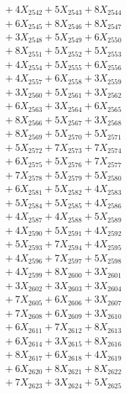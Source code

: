 \documentclass[a4paper,10pt]{article}
\begin{document}
{\begin{align}
&\;  + 4 X_{2542} + 5 X_{2543} + 8 X_{2544} \\[0.3ex]
&\;  + 6 X_{2545} + 8 X_{2546} + 8 X_{2547} \\[0.3ex]
&\;  + 3 X_{2548} + 5 X_{2549} + 6 X_{2550} \\[0.3ex]
&\;  + 8 X_{2551} + 5 X_{2552} + 5 X_{2553} \\[0.3ex]
&\;  + 4 X_{2554} + 5 X_{2555} + 6 X_{2556} \\[0.3ex]
&\;  + 4 X_{2557} + 6 X_{2558} + 3 X_{2559} \\[0.5ex]\allowbreak
&\;  + 3 X_{2560} + 5 X_{2561} + 3 X_{2562} \\[0.3ex]
&\;  + 6 X_{2563} + 3 X_{2564} + 6 X_{2565} \\[0.3ex]
&\;  + 8 X_{2566} + 5 X_{2567} + 3 X_{2568} \\[0.3ex]
&\;  + 8 X_{2569} + 5 X_{2570} + 5 X_{2571} \\[0.3ex]
&\;  + 5 X_{2572} + 7 X_{2573} + 7 X_{2574} \\[0.3ex]
&\;  + 6 X_{2575} + 5 X_{2576} + 7 X_{2577} \\[0.3ex]
&\;  + 7 X_{2578} + 5 X_{2579} + 5 X_{2580} \\[0.3ex]
&\;  + 6 X_{2581} + 5 X_{2582} + 4 X_{2583} \\[0.3ex]
&\;  + 5 X_{2584} + 5 X_{2585} + 4 X_{2586} \\[0.3ex]
&\;  + 4 X_{2587} + 4 X_{2588} + 5 X_{2589} \\[0.5ex]\allowbreak
&\;  + 4 X_{2590} + 5 X_{2591} + 4 X_{2592} \\[0.3ex]
&\;  + 5 X_{2593} + 7 X_{2594} + 4 X_{2595} \\[0.3ex]
&\;  + 4 X_{2596} + 7 X_{2597} + 5 X_{2598} \\[0.3ex]
&\;  + 4 X_{2599} + 8 X_{2600} + 3 X_{2601} \\[0.3ex]
&\;  + 3 X_{2602} + 3 X_{2603} + 3 X_{2604} \\[0.3ex]
&\;  + 7 X_{2605} + 6 X_{2606} + 3 X_{2607} \\[0.3ex]
&\;  + 7 X_{2608} + 6 X_{2609} + 3 X_{2610} \\[0.3ex]
&\;  + 6 X_{2611} + 7 X_{2612} + 8 X_{2613} \\[0.3ex]
&\;  + 6 X_{2614} + 3 X_{2615} + 8 X_{2616} \\[0.3ex]
&\;  + 8 X_{2617} + 6 X_{2618} + 4 X_{2619} \\[0.5ex]\allowbreak
&\;  + 6 X_{2620} + 8 X_{2621} + 8 X_{2622} \\[0.3ex]
&\;  + 7 X_{2623} + 3 X_{2624} + 5 X_{2625} \\[0.3ex]

\end{align}}
\end{document}
